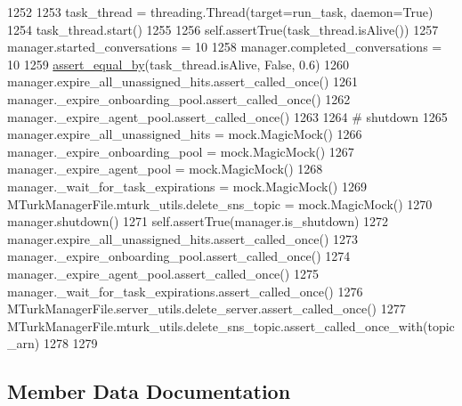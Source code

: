 \begin{DoxyCode}
1252 
1253         task\_thread = threading.Thread(target=run\_task, daemon=\textcolor{keyword}{True})
1254         task\_thread.start()
1255 
1256         self.assertTrue(task\_thread.isAlive())
1257         manager.started\_conversations = 10
1258         manager.completed\_conversations = 10
1259         \hyperlink{namespaceparlai_1_1mturk_1_1core_1_1test_1_1test__mturk__manager_a1fd7ac4fedefa65d2416601107dbe44c}{assert\_equal\_by}(task\_thread.isAlive, \textcolor{keyword}{False}, 0.6)
1260         manager.expire\_all\_unassigned\_hits.assert\_called\_once()
1261         manager.\_expire\_onboarding\_pool.assert\_called\_once()
1262         manager.\_expire\_agent\_pool.assert\_called\_once()
1263 
1264         \textcolor{comment}{# shutdown}
1265         manager.expire\_all\_unassigned\_hits = mock.MagicMock()
1266         manager.\_expire\_onboarding\_pool = mock.MagicMock()
1267         manager.\_expire\_agent\_pool = mock.MagicMock()
1268         manager.\_wait\_for\_task\_expirations = mock.MagicMock()
1269         MTurkManagerFile.mturk\_utils.delete\_sns\_topic = mock.MagicMock()
1270         manager.shutdown()
1271         self.assertTrue(manager.is\_shutdown)
1272         manager.expire\_all\_unassigned\_hits.assert\_called\_once()
1273         manager.\_expire\_onboarding\_pool.assert\_called\_once()
1274         manager.\_expire\_agent\_pool.assert\_called\_once()
1275         manager.\_wait\_for\_task\_expirations.assert\_called\_once()
1276         MTurkManagerFile.server\_utils.delete\_server.assert\_called\_once()
1277         MTurkManagerFile.mturk\_utils.delete\_sns\_topic.assert\_called\_once\_with(topic\_arn)
1278 
1279 
\end{DoxyCode}


\subsection{Member Data Documentation}
\mbox{\label{classparlai_1_1mturk_1_1core_1_1legacy__2018_1_1test_1_1test__mturk__manager_1_1TestMTurkManagerLifecycleFunctions_ae493ff13abfcd39062b9f59646f2cc78}} 
